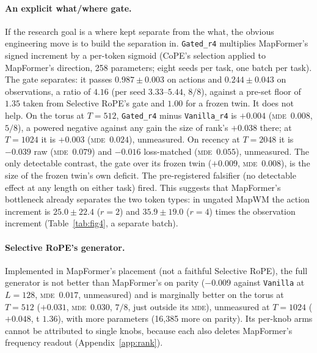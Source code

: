 \documentclass[10pt]{article}
\newcommand{\mde}{\textsc{mde}}
\newcommand{\arm}[1]{\texttt{#1}}
\begin{document}
\paragraph{An explicit what/where gate.} If the research goal is a where kept separate from the what,
the obvious engineering move is to build the separation in. \arm{Gated\_r4} multiplies MapFormer's signed
increment by a per-token sigmoid (CoPE's selection applied to MapFormer's direction, 258 parameters;
eight seeds per task, one batch per task). The gate separates: it passes $0.987\pm0.003$ on actions and
$0.244\pm0.043$ on observations, a ratio of $4.16$ (per seed $3.33$--$5.44$, $8/8$), against a
pre-set floor of $1.35$ taken from Selective RoPE's gate and $1.00$ for a frozen twin. It does not help.
On the torus at $T=512$, \arm{Gated\_r4} minus \arm{Vanilla\_r4} is $+0.004$ (\mde\ $0.008$, $5/8$), a
powered negative against any gain the size of rank's $+0.038$ there; at $T=1024$ it is $+0.003$ (\mde\
$0.024$), unmeasured. On recency at $T=2048$ it is $-0.039$ raw (\mde\ $0.079$) and $-0.016$ loss-matched
(\mde\ $0.055$), unmeasured. The only detectable contrast, the gate over its frozen twin ($+0.009$, \mde\
$0.008$), is the size of the frozen twin's own deficit. The pre-registered falsifier (no detectable effect at
any length on either task) fired. This suggests that MapFormer's bottleneck already separates the two token
types: in ungated MapWM the action increment is $25.0\pm22.4$ ($r=2$) and $35.9\pm19.0$ ($r=4$) times the
observation increment (Table~\ref{tab:fig4}, a separate batch).

\paragraph{Selective RoPE's generator.} Implemented in MapFormer's placement (not a faithful Selective
RoPE), the full generator is not better than MapFormer's on parity ($-0.009$ against \arm{Vanilla} at $L=128$,
\mde\ $0.017$, unmeasured) and is marginally better on the torus at $T=512$ ($+0.031$, \mde\ $0.030$, $7/8$, just
outside its \mde), unmeasured at $T=1024$ ($+0.048$, t $1.36$), with more parameters (16,385 more on parity). Its per-knob arms cannot be attributed to single knobs,
because each also deletes MapFormer's frequency readout (Appendix~\ref{app:rank}). %
\end{document}
